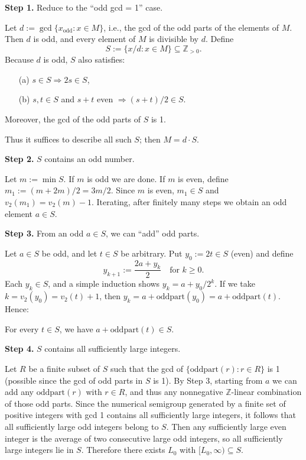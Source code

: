 \documentclass[12pt,a4paper]{article}
\theoremstyle{definition}
\begin{document}
    \textbf{Step 1.} Reduce to the ``odd gcd = 1'' case.

    Let $d := \gcd\{x_{\text{odd}} : x \in M\}$, i.e., the gcd of the odd parts of the elements of $M$. Then $d$ is odd, and every element of $M$ is divisible by $d$. Define
    $$S := \{x/d : x \in M\} \subseteq \mathbb{Z}_{>0}.$$
    Because $d$ is odd, $S$ also satisfies:
    \begin{itemize}
        \item[(a)] $s \in S \Rightarrow 2s \in S$,
        \item[(b)] $s,t \in S$ and $s+t$ even $\Rightarrow (s+t)/2 \in S$.
    \end{itemize}
    Moreover, the gcd of the odd parts of $S$ is 1.

    Thus it suffices to describe all such $S$; then $M = d \cdot S$.

    \textbf{Step 2.} $S$ contains an odd number.

    Let $m := \min S$. If $m$ is odd we are done. If $m$ is even, define $m_1 := (m+2m)/2 = 3m/2$. Since $m$ is even, $m_1 \in S$ and $v_2(m_1) = v_2(m) - 1$. Iterating, after finitely many steps we obtain an odd element $a \in S$.

    \textbf{Step 3.} From an odd $a \in S$, we can ``add'' odd parts.

    Let $a \in S$ be odd, and let $t \in S$ be arbitrary. Put $y_0 := 2t \in S$ (even) and define
    $$y_{k+1} := \frac{2a + y_k}{2} \quad \text{for } k \geq 0.$$
    Each $y_k \in S$, and a simple induction shows $y_k = a + y_0/2^k$. If we take $k = v_2(y_0) = v_2(t)+1$, then $y_k = a + \text{oddpart}(y_0) = a + \text{oddpart}(t)$. Hence:

    For every $t \in S$, we have $a + \text{oddpart}(t) \in S$.

    \textbf{Step 4.} $S$ contains all sufficiently large integers.

    Let $R$ be a finite subset of $S$ such that the gcd of $\{\text{oddpart}(r) : r \in R\}$ is 1 (possible since the gcd of odd parts in $S$ is 1). By Step 3, starting from $a$ we can add any $\text{oddpart}(r)$ with $r \in R$, and thus any nonnegative $\mathbb{Z}$-linear combination of those odd parts. Since the numerical semigroup generated by a finite set of positive integers with gcd 1 contains all sufficiently large integers, it follows that all sufficiently large odd integers belong to $S$. Then any sufficiently large even integer is the average of two consecutive large odd integers, so all sufficiently large integers lie in $S$. Therefore there exists $L_0$ with $[L_0, \infty) \subseteq S$.
\end{document}
